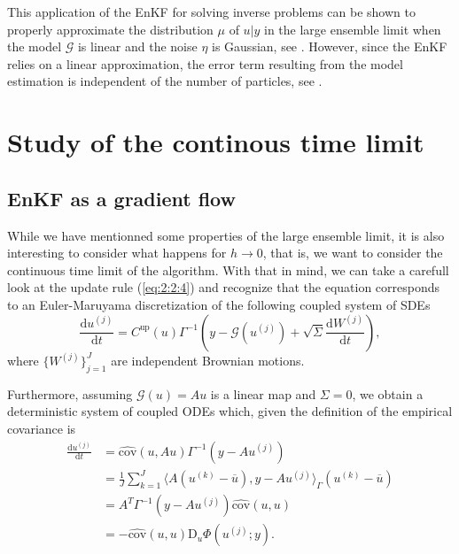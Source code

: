 \documentclass[a4paper,twocolumn,10pt]{article}
\begin{document}
This application of the EnKF for solving inverse problems can be shown to properly approximate the
distribution $\mu$ of $u|y$ in the large ensemble limit when the model $\mathcal{G}$ is linear and
the noise $\eta$ is Gaussian, see \cite{goldstein2007bayes, law2016deterministic}. However, since the
EnKF relies on a linear approximation, the error term resulting from the model estimation is independent
of the number of particles, see \cite{ernst2015analysis}.

\section{Study of the continous time limit} \label{sec:3}
\subsection{EnKF as a gradient flow} \label{subsec:3:1}
While we have mentionned some properties of the large ensemble limit, it is also interesting to consider
what happens for $h \rightarrow 0$, that is, we want to consider the continuous time limit
of the algorithm. With that in mind, we can take a carefull look at the update rule (\ref{eq:2:2:4}) and
recognize that the equation corresponds to an Euler-Maruyama discretization of the following coupled
system of SDEs
\begin{equation} \label{eq:3:1:1}
    \frac{\text{d}u^{(j)}}{\text{d}t} = C^{\text{up}}(u)\Gamma^{-1}\left(y - \mathcal{G}(u^{(j)}) + \sqrt{\Sigma}\frac{\text{d}W^{(j)}}{\text{d}t}\right),
\end{equation}
where $\{W^{(j)}\}_{j=1}^J$ are independent Brownian motions. 

Furthermore, assuming $\mathcal{G}(u) = Au$ is a linear map and $\Sigma = 0$, we obtain a deterministic
system of coupled ODEs which, given the definition of the empirical covariance is
\begin{equation} \label{eq:3:1:2}
\begin{aligned}
    \frac{\text{d}u^{(j)}}{\text{d}t} &= \hat{\text{cov}}(u, Au)\Gamma^{-1}(y - Au^{(j)})\\
&= \frac1J\sum_{k=1}^J \langle A(u^{(k)} - \overline{u}), y - Au^{(j)}\rangle_\Gamma(u^{(k)} - \overline{u})\\
&= A^T\Gamma^{-1}(y - Au^{(j)}) \hat{\text{cov}}(u, u)\\
&= -\hat{\text{cov}}(u, u)\text{D}_u\Phi(u^{(j)}; y).
\end{aligned}
\end{equation}
\end{document}
